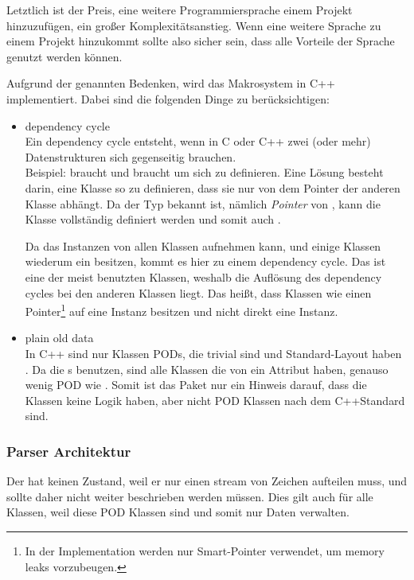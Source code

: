       Letztlich ist der Preis, eine weitere Programmiersprache einem Projekt hinzuzufügen, ein großer Komplexitätsanstieg. Wenn eine weitere Sprache zu einem Projekt hinzukommt sollte also sicher sein, dass alle Vorteile der Sprache genutzt werden können.


      Aufgrund der genannten Bedenken, wird das Makrosystem in C++ implementiert. Dabei sind die folgenden Dinge zu berücksichtigen:
      \begin{itemize}
        \item dependency cycle\\
          Ein dependency cycle entsteht, wenn in C oder C++ zwei (oder mehr) Datenstrukturen sich gegenseitig brauchen.\\
          Beispiel:  braucht  und  braucht  um sich zu definieren. Eine Lösung besteht darin, eine Klasse so zu definieren, dass sie nur von dem Pointer der anderen Klasse abhängt. Da der Typ bekannt ist, nämlich \emph{Pointer} von , kann die Klasse  vollständig definiert werden und somit auch .

          Da das  Instanzen von allen  Klassen aufnehmen kann, und einige Klassen wiederum ein  besitzen, kommt es hier zu einem dependency cycle. Das  ist eine der meist benutzten Klassen, weshalb die Auflösung des dependency cycles bei den anderen Klassen liegt. Das heißt, dass Klassen wie  einen Pointer\footnote{
            In der Implementation werden nur Smart-Pointer verwendet, um memory leaks vorzubeugen.
          } auf eine  Instanz besitzen und nicht direkt eine  Instanz.
        \item plain old data\\
          In C++ sind nur Klassen PODs, die trivial sind und Standard-Layout haben \autocite[9 Classes §10]{C++14-std}. Da die s  benutzen, sind alle Klassen die von  ein Attribut haben, genauso wenig POD wie . Somit ist das  Paket nur ein Hinweis darauf, dass die Klassen keine Logik haben, aber nicht POD Klassen nach dem C++Standard sind.
      \end{itemize}

    \subsubsection{Parser Architektur}
    \label{sssec:Parser Architektur}
      Der  hat keinen Zustand, weil er nur einen stream von Zeichen aufteilen muss, und sollte daher nicht weiter beschrieben werden müssen. Dies gilt auch für alle  Klassen, weil diese POD Klassen sind und somit nur Daten verwalten.

